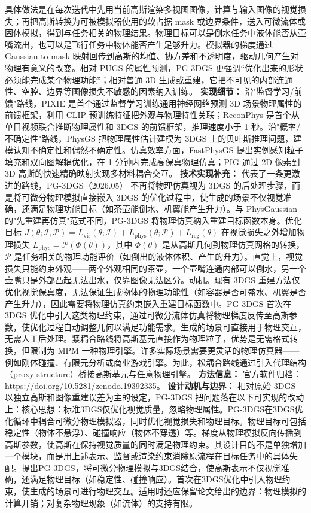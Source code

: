 具体做法是在每次迭代中先用当前高斯渲染多视图图像，计算与输入图像的视觉损失；再把高斯转换为可被模拟器使用的软占据 mask 或边界条件，送入可微流体或固体模拟，得到与任务相关的物理结果。物理目标可以是倒水任务中液体能否从壶嘴流出，也可以是飞行任务中物体能否产生足够升力。模拟器的梯度通过 Gaussian-to-mask 映射回传到高斯的均值、协方差和不透明度，驱动几何产生对物理有意义的改变。相对 PUGS 的属性预测，PG-3DGS 更强调“优化出来的形状必须能完成某个物理功能”；相对普通 3D 生成或重建，它把不可见的内部连通性、空腔、边界等图像损失不敏感的因素纳入训练。
\textbf{实现细节：} 沿"监督学习/前馈"路线，PIXIE 是首个通过监督学习训练通用神经网络预测 3D 场景物理属性的前馈框架，利用 CLIP 预训练特征把外观与物理特性关联；ReconPhys 是首个从单目视频联合推断物理属性和 3DGS 的前馈框架，推理速度小于 1 秒。沿"概率/不确定性"路线，PhysGS 把物理属性估计建模为 3DGS 上的贝叶斯推理问题，建模认知不确定性和偶然不确定性。仿真效率方面，FastPhysGS 提出实例感知粒子填充和双向图解耦优化，在 1 分钟内完成高保真物理仿真；PIG 通过 2D 像素到 3D 高斯的快速精确映射实现多材料耦合交互。
\textbf{技术实现补充：} 代表了一条更激进的路线，PG-3DGS（2026.05） 不再将物理仿真视为 3DGS 的后处理步骤，而是将可微分物理模拟直接嵌入 3DGS 的优化过程中，使生成的场景不仅视觉准确，还满足物理功能目标（如茶壶能倒水、机翼能产生升力）。与 PhysGaussian 的"先重建再仿真"范式不同，PG-3DGS 将物理仿真纳入重建目标函数本身。优化目标 $J(\theta; \mathcal{I}, \mathcal{P}) = L_{\mathrm{vis}}(\theta; \mathcal{I}) + L_{\mathrm{phys}}(\theta; \mathcal{P}) + L_{\mathrm{reg}}(\theta)$ 在视觉损失之外增加物理损失 $L_{\mathrm{phys}} = \mathcal{P}(\Phi(\theta))$，其中 $\Phi(\theta)$ 是从高斯几何到物理仿真网格的转换，$\mathcal{P}$ 是任务相关的物理功能评价（如倒出的液体体积、产生的升力）。直觉上，视觉损失只能约束外观——两个外观相同的茶壶，一个壶嘴连通内部可以倒水，另一个壶嘴只是外部凸起无法出水，仅靠图像无法区分。动机。现有 3DGS 重建方法仅优化视觉保真度，无法保证生成物体的物理功能性（如容器是否可盛水、机翼是否产生升力），因此需要将物理仿真约束嵌入重建目标函数中。PG-3DGS 首次在 3DGS 优化中引入这类物理约束，通过可微分流体仿真将物理梯度反传至高斯参数，使优化过程自动调整几何以满足功能需求。生成的场景可直接用于物理交互，无需人工后处理。紧耦合路线将高斯基元直接作为物理粒子，优势是无需格式转换，但限制为 MPM 一种物理引擎。许多实际场景需要更灵活的物理仿真器——例如刚体碰撞、有限元分析或商业游戏引擎。为此，松耦合路线通过引入代理结构（proxy structure）桥接高斯基元与任意物理引擎。
\textbf{方法信息：} 官方软件归档：\url{https://doi.org/10.5281/zenodo.19392335}。
\textbf{设计动机与边界：} 相对原始 3DGS 以独立高斯和图像重建误差为主的设定，PG-3DGS 把问题落在以下可实现的改动上：核心思想：标准3DGS仅优化视觉质量，忽略物理属性。PG-3DGS在3DGS优化循环中耦合可微分物理模拟器，同时优化视觉损失和物理目标。物理目标可包括稳定性（物体不悬浮）、碰撞响应（物体不穿透）等。梯度从物理模拟反向传播到高斯参数，使高斯在保持视觉质量的同时满足物理约束。其设计目的不是单独增加一个模块，而是用上述表示、监督或渲染约束消除原流程在目标任务中的具体失配。提出PG-3DGS，将可微分物理模拟与3DGS结合，使高斯表示不仅视觉准确，还满足物理目标（如稳定性、碰撞响应）。首次在3DGS优化中引入物理约束，使生成的场景可进行物理交互。适用时还应保留论文给出的边界：物理模拟的计算开销；对复杂物理现象（如流体）的支持有限。

